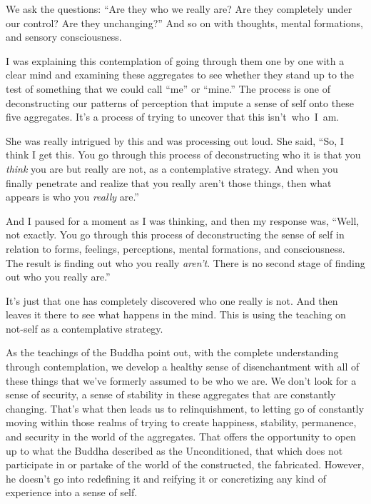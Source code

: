 \enlargethispage{1\baselineskip}
We ask the questions: ``Are they who we really are? Are they completely under our control? Are they unchanging?'' And so on with thoughts, mental formations, and sensory consciousness.

I was explaining this contemplation of going through them one by one with a clear mind and examining these aggregates to see whether they stand up to the test of something that we could call ``me'' or ``mine.'' The process is one of deconstructing our patterns of perception that impute a sense of self onto these five aggregates. It's a process of trying to uncover that this \mbox{isn't who I am.}

She was really intrigued by this and was processing out loud. She said, ``So, I think I get this. You go through this process of deconstructing who it is that you \emph{think} you are but really are not, as a contemplative strategy. And when you finally penetrate and realize that you really aren't those things, then what appears is who you \emph{really} are.''

And I paused for a moment as I was thinking, and then my response was, ``Well, not exactly. You go through this process of deconstructing the sense of self in relation to forms, feelings, perceptions, mental formations, and consciousness. The result is finding out who you really \emph{aren't}. There is no second stage of finding out who you really are.''

It's just that one has completely discovered who one really is not. And then leaves it there to see what happens in the mind. This is using the teaching on not-self as a contemplative strategy.

As the teachings of the Buddha point out, with the complete understanding through contemplation, we develop a healthy sense of disenchantment with all of these things that we've formerly assumed to be who we are. We don't look for a sense of security, a sense of stability in these aggregates that are constantly changing. That's what then leads us to relinquishment, to letting go of constantly moving within those realms of trying to create happiness, stability, permanence, and security in the world of the aggregates. That offers the opportunity to open up to what the Buddha described as the Unconditioned, that which does not participate in or partake of the world of the constructed, the fabricated. However, he doesn't go into redefining it and reifying it or concretizing any kind of experience into a sense of self.

